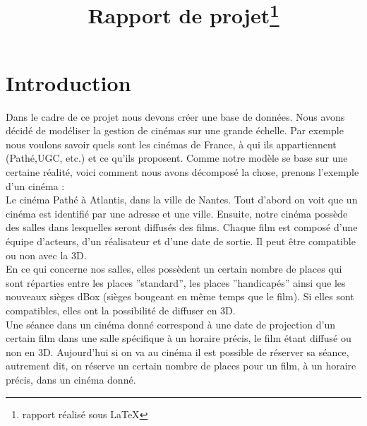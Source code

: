 \documentclass[a4paper,sffamily,12pt]{article}
\title{\vspace{\fill}\LARGE\bfseries\sffamily Rapport de projet\protect\footnote{rapport réalisé sous \LaTeX} \vspace{\fill}}
\begin{document}
	\date{} %
	\maketitle %

	\thispagestyle{fancy} %
	
	\newpage
			
	\renewcommand{\contentsname}{Sommaire}
	\tableofcontents
	
	\newpage
	
	\section{Introduction}
		
		\vspace{0.5cm}
		
		Dans le cadre de ce projet nous devons créer une base de données. Nous avons décidé de modéliser la gestion de cinémas sur une grande échelle. Par exemple nous voulons savoir quels sont les cinémas de France, à qui ils appartiennent (Pathé,UGC, etc.) et ce qu'ils proposent. Comme notre modèle se base sur une certaine réalité, voici comment nous avons décomposé la chose, prenons  l'exemple d'un cinéma : \\
		\indent Le cinéma Pathé à Atlantis, dans la ville de Nantes. Tout d'abord on voit que un cinéma est identifié par une adresse et une ville. Ensuite, notre cinéma possède des salles dans lesquelles seront diffusés des films. Chaque film est composé d'une équipe d'acteurs, d'un réalisateur et d'une date de sortie. Il peut être compatible ou non avec la 3D. \\ 				
		\indent En ce qui concerne nos salles, elles possèdent un certain nombre de places qui sont réparties entre les places ''standard'', les places ''handicapés'' ainsi que les nouveaux sièges dBox (sièges bougeant en même temps que le film). Si elles sont compatibles, elles ont la possibilité de diffuser en 3D. \\
		\indent Une séance dans un cinéma donné correspond à une date de projection d'un certain film dans une salle spécifique à un horaire précis, le film étant diffusé ou non en 3D. Aujourd'hui si on va au cinéma il est possible de réserver sa séance, autrement dit, on réserve un certain nombre de places pour un film, à un horaire précis, dans un cinéma donné. 

		\vspace{0.5cm}
	
\end{document}

